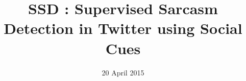 \documentclass[10pt,conference]{IEEEtran}
\begin{document}
\title{SSD : Supervised Sarcasm Detection in Twitter using Social Cues}

\author{
}


\date{20 April 2015}

\maketitle




%
%







%
%
%



{\footnotesize}
\end{document}
